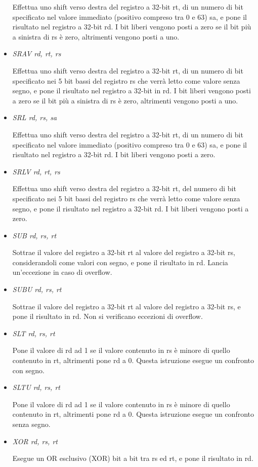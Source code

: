 \documentclass[letterpaper,10pt,english]{sphinxmanual}
\begin{document}
\begin{itemize}
Effettua uno shift verso destra del registro a 32-bit rt, di un numero di
bit specificato nel valore immediato (positivo compreso tra 0 e 63) sa, e
pone il risultato nel registro a 32-bit rd.  I bit liberi vengono posti a
zero se il bit più a sinistra di rs è zero, altrimenti vengono posti
a uno.

\item {} 
\emph{SRAV rd, rt, rs}

Effettua uno shift verso destra del registro a 32-bit rt, di un numero di
bit specificato nei 5 bit bassi del registro rs che verrà letto come
valore senza segno, e pone il risultato nel registro a 32-bit in rd.  I bit
liberi vengono posti a zero se il bit più a sinistra di rs è zero,
altrimenti vengono posti a uno.

\item {} 
\emph{SRL rd, rs, sa}

Effettua uno shift verso destra del registro a 32-bit rt, di un numero di
bit specificato nel valore immediato (positivo compreso tra 0 e 63) sa, e
pone il risultato nel registro a 32-bit rd. I bit liberi vengono posti a
zero.

\item {} 
\emph{SRLV rd, rt, rs}

Effettua uno shift verso destra del registro a 32-bit rt, del numero di bit
specificato nei 5 bit bassi del registro rs che verrà letto come valore
senza segno, e pone il risultato nel registro a 32-bit rd. I bit liberi
vengono posti a zero.

\item {} 
\emph{SUB rd, rs, rt}

Sottrae il valore del registro a 32-bit rt al valore del registro a 32-bit
rs, considerandoli come valori con segno, e pone il risultato in rd. Lancia
un'eccezione in caso di overflow.

\item {} 
\emph{SUBU rd, rs, rt}

Sottrae il valore del registro a 32-bit rt al valore del registro a 32-bit
rs, e pone il risultato in rd.
Non si verificano eccezioni di overflow.

\end{itemize}
\begin{itemize}
\item {} 
\emph{SLT rd, rs, rt}

Pone il valore di rd ad 1 se il valore contenuto in rs è minore di
quello contenuto in rt, altrimenti pone rd a 0. Questa istruzione esegue un
confronto con segno.

\item {} 
\emph{SLTU rd, rs, rt}

Pone il valore di rd ad 1 se il valore contenuto in rs è minore di
quello contenuto in rt, altrimenti pone rd a 0. Questa istruzione esegue un
confronto senza segno.

\item {} 
\emph{XOR rd, rs, rt}

Esegue un OR esclusivo (XOR) bit a bit tra rs ed rt, e pone il risultato in
rd.

\end{itemize}
\end{document}
